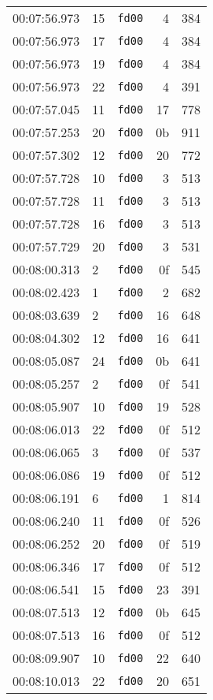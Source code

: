 \documentclass{article}
\begin{document}
\begin{longtable}{lllrr}
00:07:56.973 & 15 & \texttt{fd00} & 4 & 384 \\
00:07:56.973 & 17 & \texttt{fd00} & 4 & 384 \\
00:07:56.973 & 19 & \texttt{fd00} & 4 & 384 \\
00:07:56.973 & 22 & \texttt{fd00} & 4 & 391 \\
00:07:57.045 & 11 & \texttt{fd00} & 17 & 778 \\
00:07:57.253 & 20 & \texttt{fd00} & 0b & 911 \\
00:07:57.302 & 12 & \texttt{fd00} & 20 & 772 \\
00:07:57.728 & 10 & \texttt{fd00} & 3 & 513 \\
00:07:57.728 & 11 & \texttt{fd00} & 3 & 513 \\
00:07:57.728 & 16 & \texttt{fd00} & 3 & 513 \\
00:07:57.729 & 20 & \texttt{fd00} & 3 & 531 \\
00:08:00.313 & 2 & \texttt{fd00} & 0f & 545 \\
00:08:02.423 & 1 & \texttt{fd00} & 2 & 682 \\
00:08:03.639 & 2 & \texttt{fd00} & 16 & 648 \\
00:08:04.302 & 12 & \texttt{fd00} & 16 & 641 \\
00:08:05.087 & 24 & \texttt{fd00} & 0b & 641 \\
00:08:05.257 & 2 & \texttt{fd00} & 0f & 541 \\
00:08:05.907 & 10 & \texttt{fd00} & 19 & 528 \\
00:08:06.013 & 22 & \texttt{fd00} & 0f & 512 \\
00:08:06.065 & 3 & \texttt{fd00} & 0f & 537 \\
00:08:06.086 & 19 & \texttt{fd00} & 0f & 512 \\
00:08:06.191 & 6 & \texttt{fd00} & 1 & 814 \\
00:08:06.240 & 11 & \texttt{fd00} & 0f & 526 \\
00:08:06.252 & 20 & \texttt{fd00} & 0f & 519 \\
00:08:06.346 & 17 & \texttt{fd00} & 0f & 512 \\
00:08:06.541 & 15 & \texttt{fd00} & 23 & 391 \\
00:08:07.513 & 12 & \texttt{fd00} & 0b & 645 \\
00:08:07.513 & 16 & \texttt{fd00} & 0f & 512 \\
00:08:09.907 & 10 & \texttt{fd00} & 22 & 640 \\
00:08:10.013 & 22 & \texttt{fd00} & 20 & 651 \\

\end{longtable}
\end{document}
